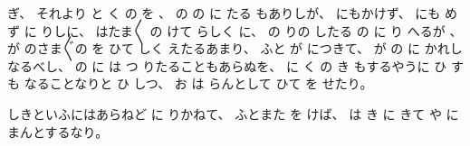 ぎ、
%
それより
と
く
の
を
、
%
の
の
に
たる
もありしが、
%
にもかけず、
%
にも
めず
に
りしに、
%
はたま〳〵
の
けて
らしく
に、
%
の
りの
したる
の
に
り
へるが
、
%
が
のさま〴〵の
を
ひて
しく
えたるあまり、
%
ふと
が
につきて、
%
が
の
に
かれしなるべし、
%
の
に
は
つ
りたることもあらぬを、
%
に
く
の
き
もするやうに
ひ
すも
なることなりと
ひ
しつ、
%
お
は
らんとして
ひて
を
せたり。

しきといふにはあらねど
に
りかねて、
%
ふとまた
を
けば、
%
は
き
に
きて
や
に
まんとするなり。

